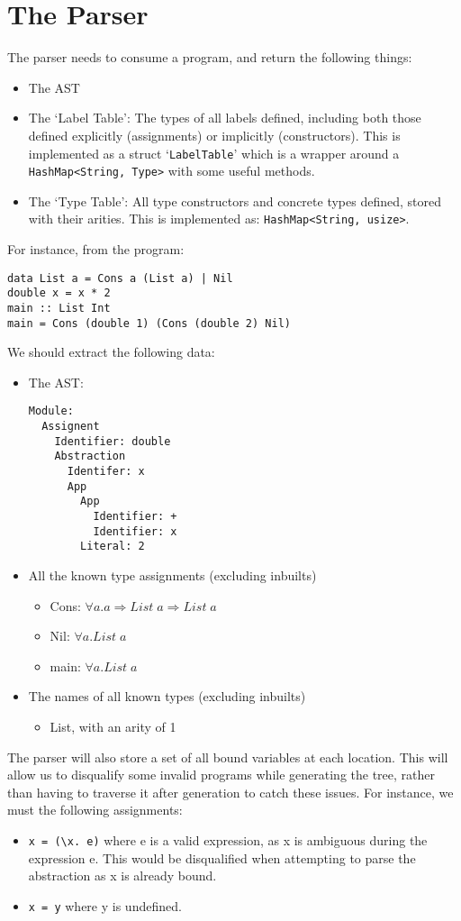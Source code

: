 \section{The Parser}
The parser needs to consume a program, and return the following things:
\begin{itemize}
    \item The AST
    \item The `Label Table': The types of all labels defined, including both those defined explicitly (assignments) or implicitly (constructors). This is implemented as a struct `\verb|LabelTable|' which is a wrapper around a \verb|HashMap<String, Type>| with some useful methods. 
    \item The `Type Table': All type constructors and concrete types defined, stored with their arities. This is implemented as: \verb|HashMap<String, usize>|.
\end{itemize}
For instance, from the program:
\begin{lstlisting}[]
data List a = Cons a (List a) | Nil
double x = x * 2	
main :: List Int
main = Cons (double 1) (Cons (double 2) Nil)
\end{lstlisting}
We should extract the following data:
\begin{itemize}
    \item The AST: 
    \begin{lstlisting}[]
Module:
  Assignent
    Identifier: double
    Abstraction
      Identifer: x
      App
        App
          Identifier: +
          Identifier: x
        Literal: 2
    \end{lstlisting}
    \item All the known type assignments (excluding inbuilts)
        \begin{itemize}
            \item Cons: \(\forall a. a \Rightarrow List\;a\Rightarrow List\;a\)
            \item Nil: \(\forall a. List\;a\)
            \item main: \(\forall a. List\;a\)
        \end{itemize}
    \item The names of all known types (excluding inbuilts) 
        \begin{itemize}
            \item List, with an arity of 1
        \end{itemize}
\end{itemize}

The parser will also store a set of all bound variables at each location. This will allow us to disqualify some invalid programs while generating the tree, rather than having to traverse it after generation to catch these issues. For instance, we must the following assignments:
\begin{itemize}
    \item \verb|x = (\x. e)| where e is a valid expression, as x is ambiguous during the expression e. This would be disqualified when attempting to parse the abstraction as x is already bound.  
    \item \verb|x = y| where y is undefined.
\end{itemize}

